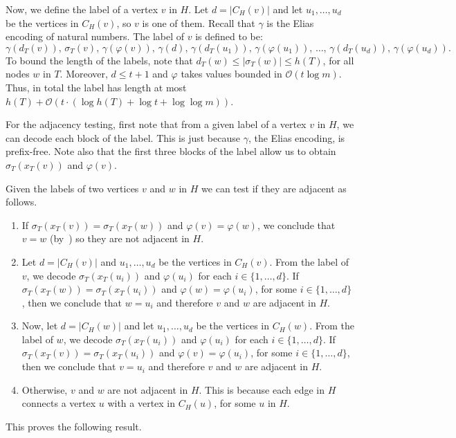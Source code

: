 \documentclass[kpfonts]{patmorin}
\newcommand{\Oh}{\mathcal{O}}
\let\le\leqslant
\let\leq\leqslant
\begin{document}
Now, we define the label of a vertex $v$ in $H$. 
Let $d=|C_H(v)|$ and let $u_1,\ldots, u_d$ be the vertices in $C_H(v)$, so $v$ is one of them. 
Recall that $\gamma$ is the Elias encoding of natural numbers.
The label of $v$ is defined to be:
\[
\gamma(d_T(v)),\, \sigma_T(v), \, \gamma(\varphi(v)), \,\gamma(d), \,
\gamma(d_T(u_1)), \,\gamma(\varphi(u_1)), \,\ldots, \,
\gamma(d_T(u_d)), \,\gamma(\varphi(u_d)).
\]
To bound the length of the labels, note that 
$d_T(w) \le |\sigma_T(w)|\leq h(T)$, for all nodes $w$ in $T$. 
Moreover, $d\leq t+1$ and $\varphi$ takes values bounded in $\Oh(t\log m)$. 
Thus, in total the label has length at most 
$h(T) + \Oh(t\cdot (\log h(T) + \log t + \log\log m))$.


For the adjacency testing, first note that from a given label of a vertex $v$ in $H$, we can decode each block of the label. 
This is just because $\gamma$, the Elias encoding, is prefix-free. 
Note also that the first three blocks of the label allow us to obtain $\sigma_T(x_T(v))$ and $\varphi(v)$.

Given the labels of two vertices $v$ and $w$ in $H$ we can test if they are adjacent as follows.
\begin{enumerate}
  \item If $\sigma_T(x_T(v)) = \sigma_T(x_T(w))$ and $\varphi(v)=\varphi(w)$, we conclude that $v=w$ (by~) so they are not adjacent in $H$. 
  \item Let $d=|C_H(v)|$ and $u_1,\ldots, u_d$ be the vertices in $C_H(v)$. 
  From the label of $v$, we decode $\sigma_T(x_T(u_i))$ and $\varphi(u_i)$ for each $i\in\{1,\ldots,d\}$.
  If $\sigma_T(x_T(w)) = \sigma_T(x_T(u_i))$ and $\varphi(w)=\varphi(u_i)$, for some $i\in\{1,\ldots,d\}$, then we conclude that $w=u_i$ and therefore $v$ and $w$ are adjacent in $H$.
  \item  Now, let $d=|C_H(w)|$ and let $u_1,\ldots, u_d$ be the vertices in $C_H(w)$. 
  From the label of $w$, we decode $\sigma_T(x_T(u_i))$ and $\varphi(u_i)$ for each $i\in\{1,\ldots,d\}$.
  If $\sigma_T(x_T(v)) = \sigma_T(x_T(u_i))$ and $\varphi(v)=\varphi(u_i)$, for some $i\in\{1,\ldots,d\}$, then we conclude that $v=u_i$ and therefore $v$ and $w$ are adjacent in $H$.
  \item Otherwise, $v$ and $w$ are not adjacent in $H$. 
  This is because each edge in $H$ connects a vertex $u$ with a vertex in $C_H(u)$, for some $u$ in $H$.
\end{enumerate}

This proves the following result. 
\end{document}
